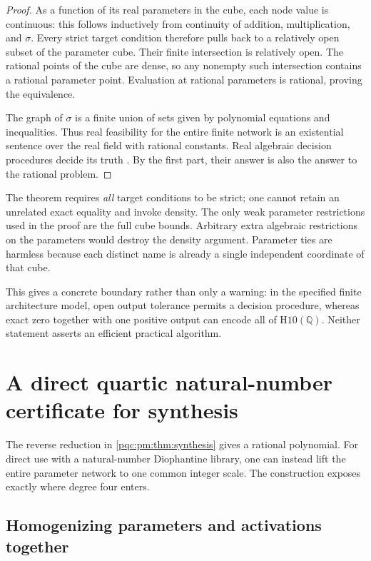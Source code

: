 \documentclass[11pt,letterpaper]{article}
\numberwithin{equation}{section}
\theoremstyle{definition}
\theoremstyle{remark}
\newcommand{\Q}{\mathbb Q}
\newcommand{\srcmark}[1]{\par\noindent{\small\itshape [source~#1]}\par}
\newcommand{\Hten}{\mathrm{H10}(\Q)}
\begin{document}
\begin{proof}
As a function of its real parameters in the cube, each node value is continuous:
this follows inductively from continuity of addition, multiplication, and
$\sigma$. Every strict target condition therefore pulls back to a relatively
open subset of the parameter cube. Their finite intersection is relatively
open. The rational points of the cube are dense, so any nonempty such
intersection contains a rational parameter point. Evaluation at rational
parameters is rational, proving the equivalence.

The graph of $\sigma$ is a finite union of sets given by polynomial equations
and inequalities. Thus real feasibility for the entire finite network is an
existential sentence over the real field with rational constants. Real
algebraic decision procedures decide its truth \cite{b62s15-tarski}. By the first
part, their answer is also the answer to the rational problem.
\end{proof}

The theorem requires \emph{all} target conditions to be strict; one cannot
retain an unrelated exact equality and invoke density. The only weak
parameter restrictions used in the proof are the full cube bounds.
Arbitrary extra algebraic restrictions on the parameters would destroy the
density argument. Parameter ties are harmless because each distinct name is
already a single independent coordinate of that cube.

This gives a concrete boundary rather than only a warning: in the specified
finite architecture model, open output tolerance permits a decision
procedure, whereas exact zero together with one positive output can encode
all of $\Hten$. Neither statement asserts an efficient practical algorithm.

\section{A direct quartic natural-number certificate for synthesis}
\label{pqc:pm:sec:quartic}
\srcmark{15}

The reverse reduction in \cref{pqc:pm:thm:synthesis} gives a rational polynomial.
For direct use with a natural-number Diophantine library, one can instead
lift the entire parameter network to one common integer scale. The
construction exposes exactly where degree four enters.

\subsection{Homogenizing parameters and activations together}
\end{document}
